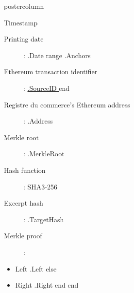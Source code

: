 \documentclass[roundedcorners=true, titleposition=center]{beamerthemeruhuisstijlposter}
\begin{document}
\begin{frame}
\begin{columns}
\begin{column}{0.95\textwidth}
\begin{beamercolorbox}[center, wd=\textwidth]{postercolumn}
\begin{minipage}[T]{0.95\textwidth}
    \hfill
\parbox[t][\columnheight]{\textwidth}{%

\begin{block}{Timestamp}
\begin{description}
    \item [Printing date] :\linebreak
{{ .Date }}
{{ range .Anchors }}
\item [Ethereum transaction identifier] :\linebreak
\href{https://etherscan.io/tx/0x{{ .SourceID }} }{ {{.SourceID }} }
{{ end }}
\item[Registre du commerce's Ethereum address] :\linebreak
{{ .Address }}
\item[Merkle root] :\linebreak
{{ .MerkleRoot }}
\item[Hash function] : \linebreak
SHA3-256
\item[Excerpt hash] :\linebreak
{{ .TargetHash }}
\item[Merkle proof] :
\end{description}
\begin{itemize}
{{ range .Proof }}
    {{ if .Left }}
        \item Left {{ .Left }}
    {{ else }}
        \item Right {{ .Right }}
    {{ end }}
{{ end }}
\end{itemize}
\end{block}
}
\end{minipage}
\end{beamercolorbox}
\end{column}
\end{columns}
\end{frame}
\end{document}
